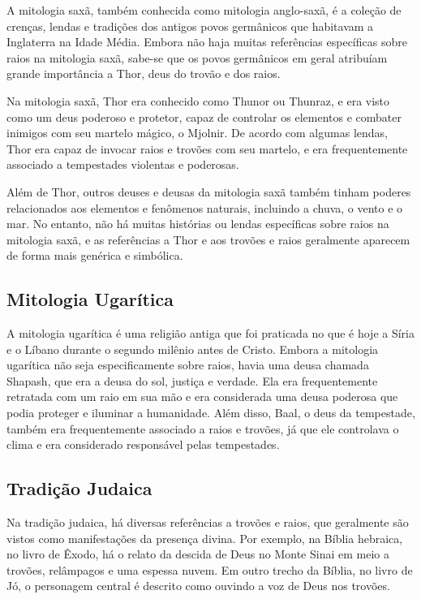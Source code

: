 \documentclass[a4paper, 12pt, onecolumn,singlespacing]{article}
\begin{document}
	A mitologia saxã, também conhecida como mitologia anglo-saxã, é a coleção de crenças, lendas e tradições dos antigos povos germânicos que habitavam a Inglaterra na Idade Média. Embora não haja muitas referências específicas sobre raios na mitologia saxã, sabe-se que os povos germânicos em geral atribuíam grande importância a Thor, deus do trovão e dos raios.
	
	Na mitologia saxã, Thor era conhecido como Thunor ou Thunraz, e era visto como um deus poderoso e protetor, capaz de controlar os elementos e combater inimigos com seu martelo mágico, o Mjolnir. De acordo com algumas lendas, Thor era capaz de invocar raios e trovões com seu martelo, e era frequentemente associado a tempestades violentas e poderosas.
	
	Além de Thor, outros deuses e deusas da mitologia saxã também tinham poderes relacionados aos elementos e fenômenos naturais, incluindo a chuva, o vento e o mar. No entanto, não há muitas histórias ou lendas específicas sobre raios na mitologia saxã, e as referências a Thor e aos trovões e raios geralmente aparecem de forma mais genérica e simbólica.
	
	\subsection{Mitologia Ugarítica}
	
	A mitologia ugarítica é uma religião antiga que foi praticada no que é hoje a Síria e o Líbano durante o segundo milênio antes de Cristo. Embora a mitologia ugarítica não seja especificamente sobre raios, havia uma deusa chamada Shapash, que era a deusa do sol, justiça e verdade. Ela era frequentemente retratada com um raio em sua mão e era considerada uma deusa poderosa que podia proteger e iluminar a humanidade. Além disso, Baal, o deus da tempestade, também era frequentemente associado a raios e trovões, já que ele controlava o clima e era considerado responsável pelas tempestades.
	
	\subsection{Tradição Judaica}
	
	Na tradição judaica, há diversas referências a trovões e raios, que geralmente são vistos como manifestações da presença divina. Por exemplo, na Bíblia hebraica, no livro de Êxodo, há o relato da descida de Deus no Monte Sinai em meio a trovões, relâmpagos e uma espessa nuvem. Em outro trecho da Bíblia, no livro de Jó, o personagem central é descrito como ouvindo a voz de Deus nos trovões.
	
\end{document}
